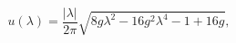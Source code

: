 \begin{equation}
    u(\lambda)=\frac{|\lambda|}{2\pi}\sqrt{8g\lambda^2-16g^2\lambda^4-1+16g},
\end{equation}

